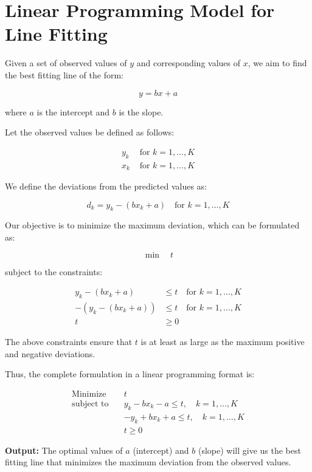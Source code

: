 \documentclass{article}
\begin{document}
\section*{Linear Programming Model for Line Fitting}

Given a set of observed values of \( y \) and corresponding values of \( x \), we aim to find the best fitting line of the form:

\[
y = bx + a
\]

where \( a \) is the intercept and \( b \) is the slope. 

Let the observed values be defined as follows:

\[
\begin{align*}
y_k & \text{ for } k = 1, \ldots, K \\
x_k & \text{ for } k = 1, \ldots, K
\end{align*}
\]

We define the deviations from the predicted values as:

\[
d_k = y_k - (bx_k + a) \quad \text{for } k = 1, \ldots, K
\]

Our objective is to minimize the maximum deviation, which can be formulated as:

\[
\min \quad t
\]

subject to the constraints:

\[
\begin{align*}
y_k - (bx_k + a) & \leq t \quad \text{for } k = 1, \ldots, K \\
-(y_k - (bx_k + a)) & \leq t \quad \text{for } k = 1, \ldots, K \\
t & \geq 0
\end{align*}
\]

The above constraints ensure that \( t \) is at least as large as the maximum positive and negative deviations.

Thus, the complete formulation in a linear programming format is:

\[
\begin{align*}
\text{Minimize} \quad & t \\
\text{subject to} \quad & y_k - bx_k - a \leq t, \quad k = 1, \ldots, K \\
& -y_k + bx_k + a \leq t, \quad k = 1, \ldots, K \\
& t \geq 0
\end{align*}
\]

\textbf{Output:} The optimal values of \( a \) (intercept) and \( b \) (slope) will give us the best fitting line that minimizes the maximum deviation from the observed values.
\end{document}
